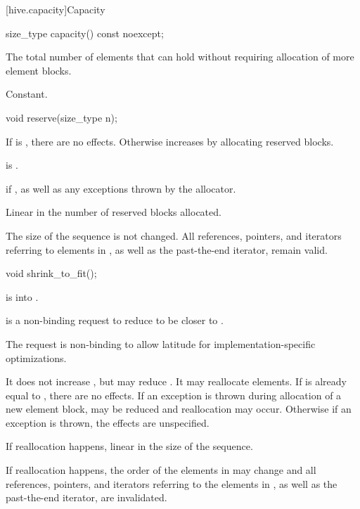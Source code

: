 [hive.capacity]{Capacity}

%
\begin{itemdecl}
size_type capacity() const noexcept;
\end{itemdecl}

\begin{itemdescr}
\pnum
\returns
The total number of elements that  can hold
without requiring allocation of more element blocks.

\pnum
\complexity
Constant.
\end{itemdescr}

%
\begin{itemdecl}
void reserve(size_type n);
\end{itemdecl}

\begin{itemdescr}
\pnum
\effects
If  is , there are no effects.
Otherwise increases  by allocating reserved blocks.

\pnum
\ensures
{} is .

\pnum
\throws
{} if ,
as well as any exceptions thrown by the allocator.

\pnum
\complexity
Linear in the number of reserved blocks allocated.

\pnum
\remarks
The size of the sequence is not changed.
All references, pointers, and iterators referring to elements in ,
as well as the past-the-end iterator, remain valid.
\end{itemdescr}

%
\begin{itemdecl}
void shrink_to_fit();
\end{itemdecl}

\begin{itemdescr}
\pnum
\expects
{} is  into .

\pnum
\effects
{} is a non-binding request
to reduce  to be closer to .
\begin{note}
The request is non-binding
to allow latitude for implementation-specific optimizations.
\end{note}
It does not increase , but may reduce .
It may reallocate elements.
If  is already equal to , there are no effects.
If an exception is thrown during allocation of a new element block,
 may be reduced and reallocation may occur.
Otherwise if an exception is thrown, the effects are unspecified.

\pnum
\complexity
If reallocation happens, linear in the size of the sequence.

\pnum
\remarks
If reallocation happens,
the order of the elements in  may change and
all references, pointers, and iterators
referring to the elements in ,
as well as the past-the-end iterator, are invalidated.
\end{itemdescr}

